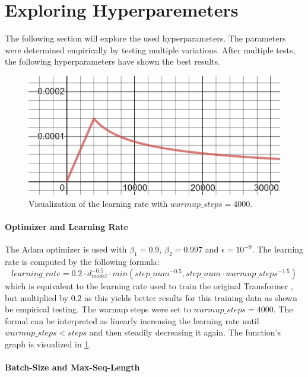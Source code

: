
\section{Exploring Hyperparemeters}

The following section will explore the used hyperparameters.
The parameters were determined empirically by testing multiple variations.
After multiple tests, the following hyperparameters have shown the best results.

\begin{figure}[h]
\centering
\includegraphics[width=0.6\paperwidth]{figures/learning-rate}
\caption{Visualization of the learning rate with $warmup\_steps = 4000$.}
\label{fig:learning-rate}
\end{figure}

\paragraph{Optimizer and Learning Rate}

The Adam optimizer \cite{article} is used with $\beta_1=0.9$, $\beta_2=0.997$ and $\epsilon = 10^{-9}$.
The learning rate is computed by the following formula:
\[
	learning\_rate = 0.2 \cdot d_{model}^{-0.5} \cdot min(step\_num^{-0.5}, step\_num \cdot warmup\_steps^{-1.5})
\]
which is equivalent to the learning rate used to train the original Transformer \cite[p.~7]{1706.03762}, but multiplied by $0.2$ as this yields better results for this training data as shown be empirical testing.
The warmup steps were set to $warmup\_steps = 4000$.
The formal can be interpreted as linearly increasing the learning rate until $warmup\_steps < steps$ and then steadily decreasing it again.
The function's graph is visualized in \cref{fig:learning-rate}.

\paragraph{Batch-Size and Max-Seq-Length}

